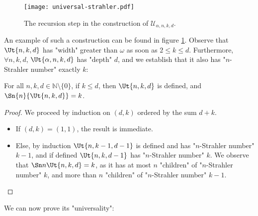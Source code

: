 \documentclass[a4paper,UKenglish,cleveref, autoref, thm-restate]{lipics-v2021}
\newcommand{\NN}{\mathbb{N}}
\newcommand{\U}{\mathcal{U}}
\renewcommand{\leq}{\leqslant}
\begin{document}
\begin{figure}[!htb]
	\texttt{[image: universal-strahler.pdf]}
	\caption{The recursion step in the construction of $\U_{\alpha,n,k,d}$.}
	\label{fig:univ-strahler}
\end{figure}

An example of such a construction can be found in figure \ref{fig:univ-strahler}.
Observe that $\Ut{n,k,d}$ has "width" greater than $\omega$ as soon as $2\leq k\leq d$.
Furthermore, $\forall n,k,d$, $\Ut{\alpha,n,k,d}$ has "depth" $d$, and we establish that it also has "$n$-Strahler number" exactly $k$:
\begin{lemma}
	For all $n,k,d\in \NN\setminus\{0\}$, if $k\leq d$, then $\Ut{n,k,d}$ is defined, and $\Sn{n} {\Ut{n,k,d}} = k$.
\end{lemma}
\begin{proof}
	We proceed by induction on $(d,k)$ ordered by the sum $d+k$.
	\begin{itemize}
		\item 	If $(d,k) = (1,1)$, the result is immediate.
		\item Else, by induction $\Ut{n,k-1,d-1}$ is defined and has "$n$-Strahler number" $k-1$, and if defined $\Ut{n,k,d-1}$ has "$n$-Strahler number" $k$. We observe that $\Sn n {\Ut{n,k,d}} = k$, as it has at most $n$ "children" of "$n$-Strahler number" $k$, and more than $n$ "children" of "$n$-Strahler number" $k-1$.\qedhere
	\end{itemize}
\end{proof}

We can now prove its "universality":
\end{document}
